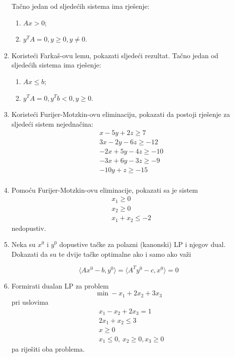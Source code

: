 \documentclass[a4paper, utf8, 11pt, colorlinks]{book}
\begin{document}
\begin{enumerate}
	Tačno jedan od sljedećih sistema ima rješenje:%
	\begin{enumerate}
		\item $Ax > 0$; 
		\item $y^T A = 0, y \geq 0, y \neq 0.$
	\end{enumerate}
 \item Koristeći Farkaš-ovu lemu, pokazati sljedeći rezultat. 	Tačno jedan od sljedećih sistema ima rješenje:%
 \begin{enumerate}
 	\item $Ax \leq b$; 
 	\item $y^T A = 0, y^T b < 0, y \geq 0.$
 \end{enumerate}
 \item  %
 Koristeći Furijer-Motzkin-ovu eliminaciju, pokazati da postoji rješenje za sljedeći sistem nejednačina:
 \begin{align*} 
 	&x - 5y + 2 z \geq 7 \\
 	&3x - 2y - 6 z \geq -12 \\
 	& -2x + 5y - 4z \geq -10 \\
 	& -3x + 6y - 3z \geq -9 \\
 	& -10 y + z \geq -15 \\  
 \end{align*}
\item Pomoću Furijer-Motzkin-ovu eliminacije, pokazati sa je sistem 
\begin{align*}
	&x_1 \geq 0 \\
	&x_2 \geq 0 \\
	& x_1 + x_2 \leq -2
\end{align*}
nedopustiv.%

\item Neka su $x^0$ i $y^0$ dopustive tačke za polazni (kanonski) LP i njegov dual. Dokazati da su te dvije tačke optimalne ako i samo ako važi 

$$\langle Ax^0-b,y^0\rangle=\langle A^Ty^0-c,x^0\rangle=0$$

\item Formirati dualan LP za problem
$$\min -x_1+2x_2+3x_3$$
pri uslovima
\begin{align}
	& x_1-x_2+2x_3=1\\
	& 2x_1+x_2\leqslant 3 \\
	& x \geq 0 \\
	& x_1\leqslant 0,\ x_2\geqslant 0, x_3\geqslant 0
\end{align}
pa riješiti oba problema.


\end{enumerate}
\end{document}
